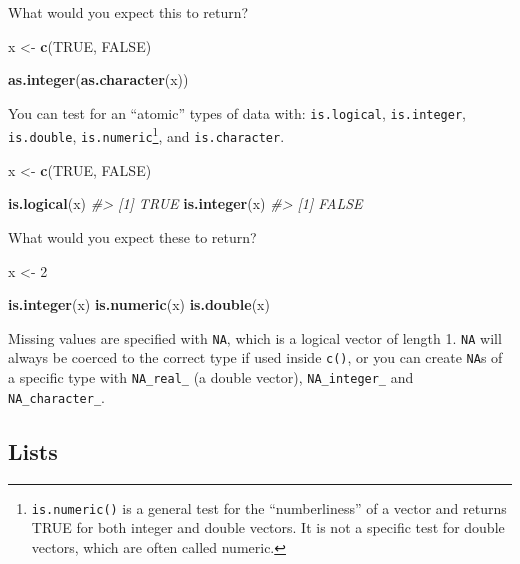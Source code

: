 \documentclass[]{book}
\newenvironment{Shaded}{\begin{snugshade}}{\end{snugshade}}
\newcommand{\CommentTok}[1]{\textcolor[rgb]{0.56,0.35,0.01}{\textit{#1}}}
\newcommand{\DecValTok}[1]{\textcolor[rgb]{0.00,0.00,0.81}{#1}}
\newcommand{\KeywordTok}[1]{\textcolor[rgb]{0.13,0.29,0.53}{\textbf{#1}}}
\newcommand{\NormalTok}[1]{#1}
\newcommand{\OtherTok}[1]{\textcolor[rgb]{0.56,0.35,0.01}{#1}}
\newcommand{\StringTok}[1]{\textcolor[rgb]{0.31,0.60,0.02}{#1}}
\let\rmarkdownfootnote\footnote%
\def\footnote{\protect\rmarkdownfootnote}
\theoremstyle{definition}
\theoremstyle{definition}
\theoremstyle{definition}
\theoremstyle{remark}
\begin{document}
What would you expect this to return?

\begin{Shaded}
\begin{Highlighting}[]
\NormalTok{x <-}\StringTok{ }\KeywordTok{c}\NormalTok{(}\OtherTok{TRUE}\NormalTok{, }\OtherTok{FALSE}\NormalTok{)}

\KeywordTok{as.integer}\NormalTok{(}\KeywordTok{as.character}\NormalTok{(x))}
\end{Highlighting}
\end{Shaded}

You can test for an ``atomic'' types of data with: \texttt{is.logical},
\texttt{is.integer}, \texttt{is.double}, \texttt{is.numeric}\footnote{\texttt{is.numeric()}
  is a general test for the ``numberliness'' of a vector and returns
  TRUE for both integer and double vectors. It is not a specific test
  for double vectors, which are often called numeric.}, and
\texttt{is.character}.

\begin{Shaded}
\begin{Highlighting}[]
\NormalTok{x <-}\StringTok{ }\KeywordTok{c}\NormalTok{(}\OtherTok{TRUE}\NormalTok{, }\OtherTok{FALSE}\NormalTok{)}

\KeywordTok{is.logical}\NormalTok{(x)}
\CommentTok{#> [1] TRUE}
\KeywordTok{is.integer}\NormalTok{(x)}
\CommentTok{#> [1] FALSE}
\end{Highlighting}
\end{Shaded}

What would you expect these to return?

\begin{Shaded}
\begin{Highlighting}[]
\NormalTok{x <-}\StringTok{ }\DecValTok{2}

\KeywordTok{is.integer}\NormalTok{(x)}
\KeywordTok{is.numeric}\NormalTok{(x)}
\KeywordTok{is.double}\NormalTok{(x)}
\end{Highlighting}
\end{Shaded}

Missing values are specified with \texttt{NA}, which is a logical vector
of length 1. \texttt{NA} will always be coerced to the correct type if
used inside \texttt{c()}, or you can create \texttt{NA}s of a specific
type with \texttt{NA\_real\_} (a double vector), \texttt{NA\_integer\_}
and \texttt{NA\_character\_}.

\hypertarget{lists}{%
\subsection{Lists}\label{lists}}
\end{document}
